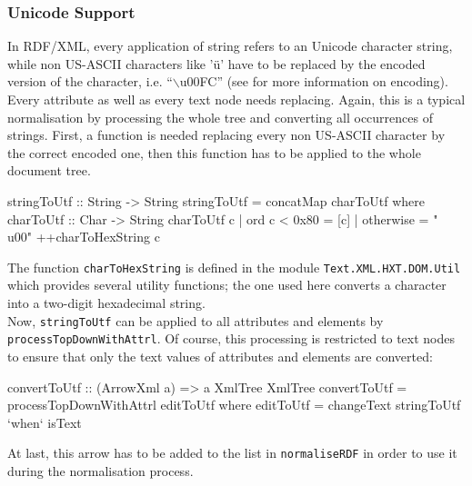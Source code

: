 \documentclass[11pt,a4paper,headsepline, bibtotoc]{scrreprt}
\begin{document}
\subsubsection{Unicode Support}
In RDF/XML, every application of string refers to an Unicode character string, while non US-ASCII characters like '\"u' have to be replaced by the encoded version of the character, i.e. ``$\backslash$u00FC'' (see \cite{CHARMOD} for more information on encoding). Every attribute as well as every text node needs replacing. Again, this is a typical normalisation by processing the whole tree and converting all occurrences of strings. First, a function is needed replacing every non US-ASCII character by the correct encoded one, then this function has to be applied to the whole document tree.
\begin{code}
stringToUtf :: String -> String
stringToUtf = concatMap charToUtf
    where
    charToUtf :: Char -> String
    charToUtf c
        | ord c < 0x80  = [c]
        | otherwise = "\\u00" ++charToHexString c
\end{code}
The function \texttt{charToHexString} is defined in the module \texttt{Text.XML.HXT.DOM.Util} which provides several utility functions; the one used here converts a character into a two-digit hexadecimal string.\\
Now, \texttt{stringToUtf} can be applied to all attributes and elements by \texttt{process\-TopDown\-WithAttrl}. Of course, this processing is restricted to text nodes to ensure that only the text values of attributes and elements are converted:
\clearpage
\begin{code}
convertToUtf :: (ArrowXml a) => a XmlTree XmlTree
convertToUtf
        = processTopDownWithAttrl editToUtf
            where 
            editToUtf = changeText stringToUtf `when` isText
\end{code}
At last, this arrow has to be added to the list in \texttt{normaliseRDF} in order to use it during the normalisation process.
\end{document}
